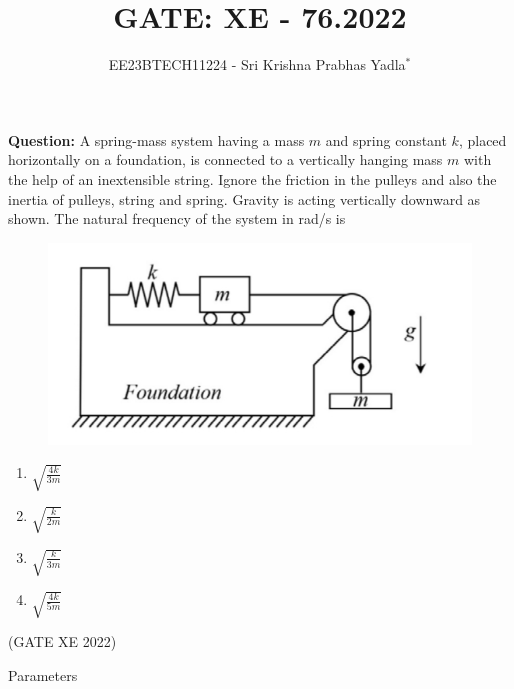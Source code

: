 \documentclass[journal,12pt,twocolumn]{IEEEtran}
\theoremstyle{remark}
\begin{document}

\vspace{3cm}

\title{GATE: XE - 76.2022}
\author{EE23BTECH11224 - Sri Krishna Prabhas Yadla$^{*}$%
}
\maketitle
\newpage
\bigskip

\renewcommand{\thefigure}{\arabic{figure}}
\renewcommand{\thetable}{\arabic{table}}


\vspace{3cm}
\textbf{Question:} A spring-mass system having a mass $m$ and spring constant $k$, placed horizontally on a foundation, is connected to a vertically hanging mass $m$ with the help of an inextensible string. Ignore the friction in the pulleys and also the inertia of pulleys, string and spring. Gravity is acting vertically downward as shown. The natural frequency of the system in rad/s is 
\begin{figure}[htbp]
	\includegraphics[width=\columnwidth]{2022/XE/76/figs/question_xe76_22.jpg}
	\label{fig:question_xe76_22}
\end{figure}
\begin{enumerate}[label=(\Alph*)]
\item $\sqrt{\frac{4k}{3m}}$
\item $\sqrt{\frac{k}{2m}}$
\item $\sqrt{\frac{k}{3m}}$
\item $\sqrt{\frac{4k}{5m}}$
\end{enumerate}
\hfill(GATE XE 2022)
\\
\solution
\fi
\begin{table}[htbp]
	\centering
	\def\arraystretch{1.5}
	
	\caption{Parameters}
	\label{tab:parameters_xe76}
\end{table}
\end{document}
